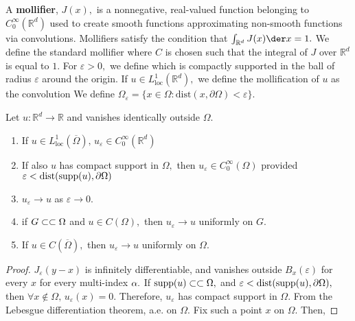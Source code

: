 A \textbf{mollifier}, $J(x),$ is a nonnegative, real-valued function belonging to $C_0^\infty(\mathbb{R}^d)$ used to create smooth functions approximating non-smooth functions via convolutions. Mollifiers satisfy the condition that $\int_{\mathbb{R}^d}J(x)\der x=1.$ We define the standard mollifier
where $C$ is chosen such that the integral of $J$ over $\mathbb{R}^d$ is equal to $1.$ For $\varepsilon>0,$ we define
which is compactly supported in the ball of radius $\varepsilon$ around the origin. If $u\in L^1_\mathrm{loc}(\mathbb{R}^d),$ we define the mollification of $u$ as the convolution
We define $\Omega_\varepsilon=\{x\in\Omega:\mathrm{dist}(x,\partial\Omega)<\varepsilon\}.$
\begin{theorem}
    Let $u:\mathbb{R}^d\rightarrow\mathbb{R}$ and vanishes identically outside $\Omega.$
    \begin{enumerate}
        \item If $u\in L^1_\mathrm{loc}(\overline{\Omega}),\,u_\varepsilon\in C_0^\infty(\mathbb{R}^d)$
        \item If also $u$ has compact support in $\Omega,$ then $u_\varepsilon\in C_0^\infty(\Omega)$ provided $\varepsilon<\mathrm{dist}(\mathrm{supp}(u),\partial\Omega)$
        \item $u_\varepsilon\rightarrow u$ as $\varepsilon\rightarrow0.$
        \item if $G\subset\subset\Omega$ and $u\in C(\Omega),$ then $u_\varepsilon\rightarrow u$ uniformly on $G.$
        \item If $u\in C(\overline{\Omega}),$ then $u_\varepsilon\rightarrow u$ uniformly on $\Omega.$
    \end{enumerate}
\end{theorem}
\begin{proof}
$J_\varepsilon(y-x)$ is infinitely differentiable, and vanishes outside $B_{x}(\varepsilon)$ for every $x$ for every multi-index $\alpha.$ If $\mathrm{supp}(u)\subset\subset\Omega,$ and $\varepsilon<\mathrm{dist} (\mathrm{supp}(u), \partial\Omega),$ then $\forall x\notin\Omega,\,u_\varepsilon(x)=0.$ Therefore, $u_\varepsilon$ has compact support in $\Omega.$
From the Lebesgue differentiation theorem,
a.e. on $\Omega.$ Fix such a point $x$ on $\Omega.$ Then,
\end{proof}


